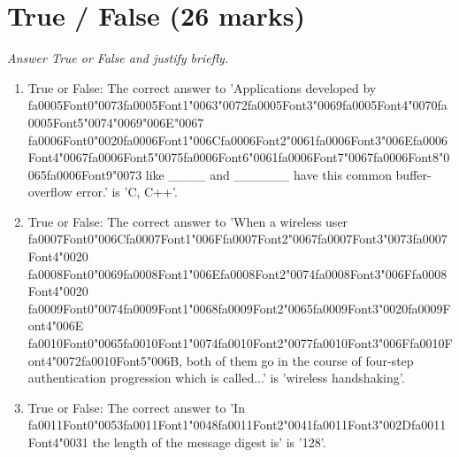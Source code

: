 \documentclass[12pt]{article}
\begin{document}
\section*{True / False (26 marks)}
\textit{Answer True or False and justify briefly.}
\begin{enumerate}[label=\arabic*.]
\item True or False: The correct answer to 'Applications developed by {\csname fa0005Font0\endcsname\char"0073}{\csname fa0005Font1\endcsname\char"0063}{\char"0072}{\csname fa0005Font3\endcsname\char"0069}{\csname fa0005Font4\endcsname\char"0070}{\csname fa0005Font5\endcsname\char"0074}{\char"0069}{\char"006E}{\char"0067} {\csname fa0006Font0\endcsname\char"0020}{\csname fa0006Font1\endcsname\char"006C}{\csname fa0006Font2\endcsname\char"0061}{\csname fa0006Font3\endcsname\char"006E}{\csname fa0006Font4\endcsname\char"0067}{\csname fa0006Font5\endcsname\char"0075}{\csname fa0006Font6\endcsname\char"0061}{\csname fa0006Font7\endcsname\char"0067}{\csname fa0006Font8\endcsname\char"0065}{\csname fa0006Font9\endcsname\char"0073} like \_\_\_\_ and \_\_\_\_\_\_ have this common buffer-overflow error.' is 'C, C++'.
\item True or False: The correct answer to 'When a wireless user {\csname fa0007Font0\endcsname\char"006C}{\csname fa0007Font1\endcsname\char"006F}{\csname fa0007Font2\endcsname\char"0067}{\csname fa0007Font3\endcsname\char"0073}{\csname fa0007Font4\endcsname\char"0020} {\csname fa0008Font0\endcsname\char"0069}{\csname fa0008Font1\endcsname\char"006E}{\csname fa0008Font2\endcsname\char"0074}{\csname fa0008Font3\endcsname\char"006F}{\csname fa0008Font4\endcsname\char"0020} {\csname fa0009Font0\endcsname\char"0074}{\csname fa0009Font1\endcsname\char"0068}{\csname fa0009Font2\endcsname\char"0065}{\csname fa0009Font3\endcsname\char"0020}{\csname fa0009Font4\endcsname\char"006E} {\csname fa0010Font0\endcsname\char"0065}{\csname fa0010Font1\endcsname\char"0074}{\csname fa0010Font2\endcsname\char"0077}{\csname fa0010Font3\endcsname\char"006F}{\csname fa0010Font4\endcsname\char"0072}{\csname fa0010Font5\endcsname\char"006B}, both of them go in the course of four-step authentication progression which is called...' is 'wireless handshaking'.
\item True or False: The correct answer to 'In {\csname fa0011Font0\endcsname\char"0053}{\csname fa0011Font1\endcsname\char"0048}{\csname fa0011Font2\endcsname\char"0041}{\csname fa0011Font3\endcsname\char"002D}{\csname fa0011Font4\endcsname\char"0031} the length of the message digest is' is '128'.

\end{enumerate}
\end{document}
